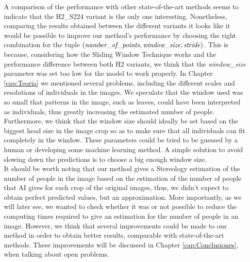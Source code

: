 A comparison of the performance with other state-of-the-art methods seems to indicate that the H2\_S224 variant is the only one interesting. Nonetheless, comparing the results obtained between the different variants it looks like it would be possible to improve our method's performance by choosing the right combination for the tuple $(\text{\textit{number\_of\_points}}, \text{\textit{window\_size}}, \text{\textit{stride}})$. This is because, considering how the Sliding Window Technique works and the performance difference between both H2 variants, we think that the \textit{window\_size} parameter was set too low for the model to work properly. In Chapter \ref{cap:Teoria} we mentioned several problems, including the different scales and resolutions of individuals in the images. We speculate that the window used was so small that patterns in the image, such as leaves, could have been interpreted as individuals, thus greatly increasing the estimated number of people. Furthermore, we think that the window size should ideally be set based on the biggest head size in the image crop so as to make sure that all individuals can fit completely in the window. 
These parameters could be tried to be guessed by a human or developing some machine learning method.
A simple solution to avoid slowing down the predictions is to choose a big enough window size.\\

It should be worth noting that our method gives a Stereology estimation of the number of people in the image based on the estimation of the number of people that AI gives for each crop of the original images, thus, we didn't expect to obtain perfect predicted values, but an approximation. More importantly, as we will later see, we wanted to check whether it was or not possible to reduce the computing times required to give an estimation for the number of people in an image. However, we think that several improvements could be made to our method in order to obtain better results, comparable with state-of-the-art methods. These improvements will be discussed in Chapter \ref{cap:Conclusiones}, when talking about open problems.\\

